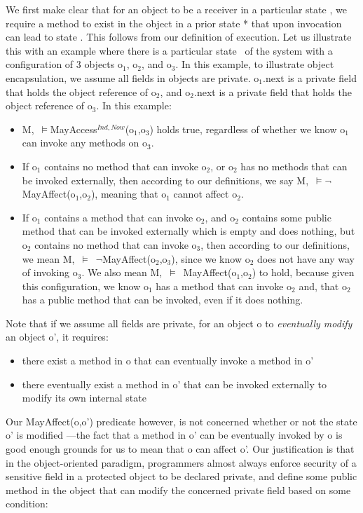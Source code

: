 \documentclass[a4paper,11pt, twoside,twocolumn]{article}
\newcommand{\losigma}{\text{$\upsigma$}}
\newcommand{\loturns} {$\vDash$}
\newcommand{\loneg}{$\boldsymbol \neg$}
\begin{document}
We first make clear that for an object to be a receiver in a particular state \losigma, we require a method to exist in the object in a prior state \losigma* that upon invocation can lead to state \losigma. This follows from our definition of execution.
Let us illustrate this with an example where there is a particular state \losigma\ of the system with a configuration of 3 objects o$_1$, o$_2$, and o$_3$. In this example, to illustrate object encapsulation, we assume all fields in objects are private. o$_1$.next is a private field that holds the object reference of o$_2$, and o$_2$.next is a private field that holds the object reference of o$_3$. In this example:
\begin{itemize}
\item M,\losigma ~\loturns MayAccess$^{Ind,Now}$(o$_1$,o$_3$) holds true, regardless of whether we know o$_1$ can invoke any methods on o$_3$.

\item If o$_1$ contains no method that can invoke o$_2$, or o$_2$ has no methods that can be invoked externally, then according to our definitions, we say M,\losigma ~\loturns \loneg MayAffect(o$_1$,o$_2$), meaning that o$_1$ cannot affect o$_2$.

\item If o$_1$ contains a method that can invoke o$_2$, and o$_2$ contains some public method that can be invoked externally which is empty and does nothing, but o$_2$ contains no method that can invoke o$_3$, then according to our definitions, we mean M,\losigma ~\loturns\ \loneg MayAffect(o$_2$,o$_3$), since we know o$_2$ does not have any way of invoking o$_3$. We also mean M,\losigma ~\loturns\ MayAffect(o$_1$,o$_2$) to hold, because given this configuration, we know o$_1$ has a method that can invoke o$_2$ and, that o$_2$ has a public method that can be invoked, even if it does nothing.
\end{itemize}
Note that if we assume all fields are private, for an object o to \textit{eventually modify} an object o', it requires:
\begin{itemize}
\item there exist a method in o that can eventually invoke a method in o'
\item there eventually exist a method in o' that can be invoked externally to modify its own internal state
\end{itemize}
Our MayAffect(o,o') predicate however, is not concerned whether or not the state o' is modified ---the fact that a method in o' can be eventually invoked by o is good enough grounds for us to mean that o can affect o'. Our justification is that in the object-oriented paradigm, programmers almost always enforce security of a sensitive field in a protected object to be declared private, and define some public method in the object that can modify the concerned private field based on some condition:
\end{document}
